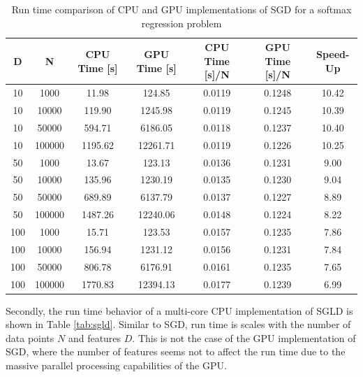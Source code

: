 \documentclass[9pt,lineno]{crone}
\begin{document}
\begin{table}[h]
	\centering
 \begin{tabular}{|c|c|c|c|c|c|c|}
 	\hline 
 	D & N & CPU Time [s] & GPU Time [s] & CPU Time [s]/N & GPU Time [s]/N & Speed-Up\\ 
 	\hline 
 	10 &	1000&	11.98&	124.85& 0.0119& 0.1248& 10.42\\
 	10&	10000&	119.90&	1245.98& 0.0119& 0.1245& 10.39\\
 	10&	50000&	594.71&	6186.05& 0.0118& 0.1237& 10.40\\
 	10&	100000&	1195.62&	12261.71& 0.0119& 0.1226& 10.25\\
 	\hline
 	50&	1000&	13.67&	123.13& 0.0136& 0.1231& 9.00\\
 	50&	10000&	135.96&	1230.19& 0.0135& 0.1230& 9.04\\
 	50&	50000&	689.89&	6137.79& 0.0137& 0.1227& 8.89\\
 	50&	100000&	1487.26&	12240.06& 0.0148& 0.1224& 8.22\\
 	\hline
 	100&	1000&	15.71&	123.53& 0.0157& 0.1235& 7.86\\
 	100	&10000&	156.94&	1231.12& 0.0156& 0.1231& 7.84\\
 	100&	50000&	806.78&	6176.91& 0.0161& 0.1235& 7.65\\
 	100&	100000&	1770.83&	12394.13& 0.0177& 0.1239& 6.99\\
 	\hline 
 \end{tabular}
\caption{Run time comparison of CPU and GPU implementations of SGD for a softmax regression problem}
\label{tab:sgd} 
\end{table}
 
Secondly, the run time behavior of a multi-core CPU implementation of SGLD is shown in Table \ref{tab:sgld}. Similar to SGD, run time is scales with the number of data points $N$ and features $D$. This is not the case of the GPU implementation of SGD, where the number of features seems not to affect the run time due to the massive parallel processing capabilities of the GPU.
\end{document}
